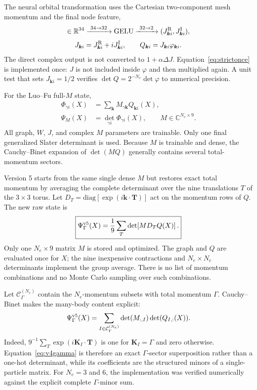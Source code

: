 The neural orbital transformation uses the Cartesian two-component mesh
momentum and the final node feature,
\begin{equation}
 [V_i^2,k_x,k_y]\in\mathbb R^{34}
 \xrightarrow{\ 34\to32\ }\mathrm{GELU}
 \xrightarrow{\ 32\to2\ }(J^{\rm R}_{\bm k i},J^{\rm I}_{\bm k i}),
\end{equation}
\begin{equation}
 J_{\bm k i}=J^{\rm R}_{\bm k i}+iJ^{\rm I}_{\bm k i},\qquad
 Q_{\bm k i}=J_{\bm k i}\varphi_{\bm k i}.
 \label{eq:strictonce}
\end{equation}
The direct complex output is not converted to $1+\alpha\Delta J$.
Equation~\eqref{eq:strictonce} is implemented once: $J$ is not included
inside $\varphi$ and then multiplied again. A unit test that sets
$J_{\bm k i}=1/2$ verifies
$\det Q=2^{-N_e}\det\varphi$ to numerical precision.

For the Luo--Fu full-$M$ state,
\begin{align}
 \Phi_{\gamma i}(X)
 &=\sum_{\bm k}M_{\gamma\bm k}Q_{\bm k i}(X),\\
 \Psi_M(X)&=\det_{\gamma i}\Phi_{\gamma i}(X),
 \qquad M\in\mathbb C^{N_e\times9}.
 \label{eq:fullM}
\end{align}
All graph, $W$, $J$, and complex $M$ parameters are trainable. Only one final
generalized Slater determinant is used. Because $M$ is trainable and dense,
the Cauchy--Binet expansion of $\det(MQ)$ generally contains several
total-momentum sectors.

Version 5 starts from the same single dense $M$ but restores exact total
momentum by averaging the complete determinant over the nine translations
$T$ of the $3\times3$ torus. Let
$D_T=\mathrm{diag}[\exp(i\bm k\cdot\bm T)]$ act on the momentum rows of $Q$.
The new raw state is
\begin{equation}
 \boxed{\Psi_\Gamma^{\rm v5}(X)=\frac1{9}\sum_T
 \det\!\left[M D_T Q(X)\right].}
 \label{eq:v4gamma}
\end{equation}
Only one $N_e\times9$ matrix $M$ is stored and optimized. The graph and $Q$
are evaluated once for $X$; the nine inexpensive contractions and
$N_e\times N_e$ determinants implement the group average. There is no list of
momentum combinations and no Monte Carlo sampling over such combinations.

Let $\mathcal C_\Gamma^{(N_e)}$ contain the $N_e$-momentum subsets with total
momentum $\Gamma$. Cauchy--Binet makes the many-body content explicit:
\begin{equation}
 \Psi_\Gamma^{\rm v5}(X)=
 \sum_{I\in\mathcal C_\Gamma^{(N_e)}}
 \det(M_{:,I})\det(Q_{I,:}(X)).
 \label{eq:v5-cauchy-binet}
\end{equation}
Indeed, $9^{-1}\sum_T\exp(i\bm K_I\cdot\bm T)$ is one for
$\bm K_I=\Gamma$ and zero otherwise. Equation~\eqref{eq:v4gamma} is therefore
an exact $\Gamma$-sector superposition rather than a one-hot determinant,
while its coefficients are the structured minors of a single-particle
matrix. For $N_e=3$ and 6, the implementation was verified numerically
against the explicit complete $\Gamma$-minor sum.

